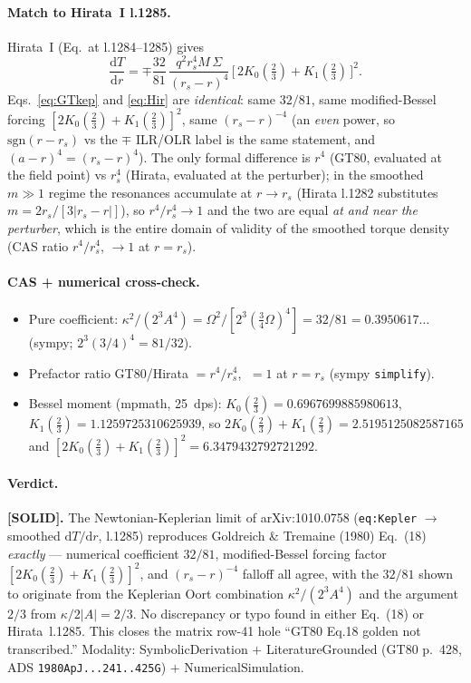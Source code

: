 \documentclass{article}
\newcommand{\rmd}{\mathrm d}
\begin{document}
\paragraph{Match to Hirata~I l.1285.} Hirata~I (Eq.~at l.1284--1285) gives
\begin{equation}
\frac{\rmd T}{\rmd r}
 = \mp\frac{32}{81}\,\frac{q^2 r_s^4 M\,\Sigma}{(r_s-r)^4}\,
   \bigl[\,2K_0(\tfrac23)+K_1(\tfrac23)\,\bigr]^2 .
\label{eq:Hir}
\end{equation}
Eqs.~\eqref{eq:GTkep} and \eqref{eq:Hir} are \emph{identical}: same $32/81$, same modified-Bessel
forcing $[2K_0(\tfrac23)+K_1(\tfrac23)]^2$, same $(r_s-r)^{-4}$ (an \emph{even} power, so
$\mathrm{sgn}(r-r_s)$ vs the $\mp$ ILR/OLR label is the same statement, and $(a-r)^4=(r_s-r)^4$).
The only formal difference is $r^4$ (GT80, evaluated at the field point) vs $r_s^4$ (Hirata,
evaluated at the perturber); in the smoothed $m\gg1$ regime the resonances accumulate at
$r\to r_s$ (Hirata l.1282 substitutes $m=2r_s/[3|r_s-r|]$), so $r^4/r_s^4\to1$ and the two are equal
\emph{at and near the perturber}, which is the entire domain of validity of the smoothed torque
density (CAS ratio $r^4/r_s^4$, $\to1$ at $r=r_s$).

\paragraph{CAS + numerical cross-check.}
\begin{itemize}
\item Pure coefficient: $\kappa^2/(2^3A^4)=\Omega^2/[2^3(\tfrac34\Omega)^4]=\boxed{32/81}=0.3950617\ldots$
      (sympy; $2^3(3/4)^4=81/32$).
\item Prefactor ratio GT80/Hirata $=r^4/r_s^4$, $\;=1$ at $r=r_s$ (sympy \texttt{simplify}).
\item Bessel moment (mpmath, 25~dps): $K_0(\tfrac23)=0.6967699885980613$,
      $K_1(\tfrac23)=1.1259725310625939$, so
      $2K_0(\tfrac23)+K_1(\tfrac23)=2.5195125082587165$ and
      $[2K_0(\tfrac23)+K_1(\tfrac23)]^2=6.3479432792721292$.
\end{itemize}

\paragraph{Verdict.} \textbf{[SOLID].} The Newtonian-Keplerian limit of arXiv:1010.0758
(\texttt{eq:Kepler} $\to$ smoothed $\rmd T/\rmd r$, l.1285) reproduces Goldreich \& Tremaine (1980)
Eq.~(18) \emph{exactly} --- numerical coefficient $32/81$, modified-Bessel forcing factor
$[2K_0(\tfrac23)+K_1(\tfrac23)]^2$, and $(r_s-r)^{-4}$ falloff all agree, with the $32/81$ shown to
originate from the Keplerian Oort combination $\kappa^2/(2^3A^4)$ and the argument $2/3$ from
$\kappa/2|A|=2/3$. No discrepancy or typo found in either Eq.~(18) or Hirata~l.1285. This closes the
matrix row-41 hole ``GT80 Eq.18 golden not transcribed.'' Modality: SymbolicDerivation
$+$ LiteratureGrounded (GT80 p.~428, ADS \texttt{1980ApJ...241..425G}) $+$ NumericalSimulation.
\end{document}
